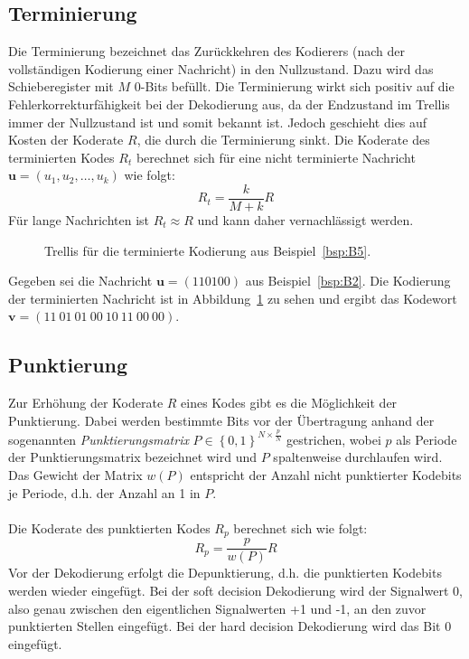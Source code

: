 \subsection{Terminierung}
\label{kapitel:grundlageen_terminierung}
Die Terminierung bezeichnet das Zurückkehren des Kodierers (nach der vollständigen Kodierung einer Nachricht) in den Nullzustand. Dazu wird das Schieberegister mit $M$ 0-Bits befüllt. Die Terminierung wirkt sich positiv auf die Fehlerkorrekturfähigkeit bei der Dekodierung aus, da der Endzustand im Trellis immer der Nullzustand ist und somit bekannt ist. Jedoch geschieht dies auf Kosten der Koderate $R$, die durch die Terminierung sinkt. Die Koderate des terminierten Kodes $R_{t}$ berechnet sich für eine nicht terminierte Nachricht $\mathbf{u}=\left( u_{1},u_{2},\dots ,u_{k}\right)$ wie folgt:
\begin{equation}
R_{t}=\frac{k}{M+k}R
\end{equation}
Für lange Nachrichten ist $R_{t}\approx R$ und kann daher vernachlässigt werden.
\begin{figure}[t]

\caption{Trellis für die terminierte Kodierung aus Beispiel~\ref{bsp:B5}.}
\label{abb:trellis_terminiert}
\end{figure}
\begin{beispiel}
Gegeben sei die Nachricht $\mathbf{u}=\left( 110100\right)$ aus Beispiel~\ref{bsp:B2}. Die Kodierung der terminierten Nachricht ist in Abbildung~\ref{abb:trellis_terminiert} zu sehen und ergibt das Kodewort $\mathbf{v}=\left( 11~01~01~00~10~11~00~00\right)$.
\label{bsp:B5}
\end{beispiel}

\subsection{Punktierung}
\label{kapitel:grundlagen_punktierung}
Zur Erhöhung der Koderate $R$ eines Kodes gibt es die Möglichkeit der Punktierung. Dabei werden bestimmte Bits vor der Übertragung anhand der sogenannten \emph{Punktierungsmatrix} $P \in {\left\lbrace 0,1 \right\rbrace}^{N\times \frac{p}{N}}$ gestrichen, wobei $p$ als Periode der Punktierungsmatrix bezeichnet wird und $P$ spaltenweise durchlaufen wird. Das Gewicht der Matrix $w(P)$ entspricht der Anzahl nicht punktierter Kodebits je Periode, d.h. der Anzahl an 1 in $P$.~\cite[S. 218]{schonfeld2012informations}
\\
\\
Die Koderate des punktierten Kodes $R_{p}$ berechnet sich wie folgt:
\begin{equation}
R_{p}=\frac{p}{w(P)}R
\end{equation}
Vor der Dekodierung erfolgt die Depunktierung, d.h. die punktierten Kodebits werden wieder eingefügt. Bei der soft decision Dekodierung wird der Signalwert 0, also genau zwischen den eigentlichen Signalwerten +1 und -1, an den zuvor punktierten Stellen eingefügt. Bei der hard decision Dekodierung wird das Bit 0 eingefügt.

